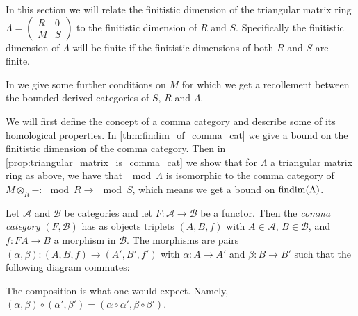 In this section we will relate the finitistic dimension of the triangular matrix ring $\Lambda = \begin{pmatrix}
R & 0\\
M& S
\end{pmatrix}$ to the finitistic dimension of $R$ and $S$. Specifically the finitistic dimension of $\Lambda$ will be finite if the finitistic dimensions of both $R$ and $S$ are finite. 

In  we give some further conditions on $M$ for which we get a recollement between the bounded derived categories of $S$, $R$ and $\Lambda$.

We will first define the concept of a comma category and describe some of its homological properties. In \cref{thm:findim_of_comma_cat} we give a bound on the finitistic dimension of the comma category. Then in \cref{prop:triangular_matrix_is_comma_cat} we show that for $\Lambda$ a triangular matrix ring as above, we have that $\mod \Lambda$ is isomorphic to the comma category of $M\otimes_R - \colon \mod R \to \mod S$, which means we get a bound on $\operatorname{findim}(\Lambda)$.

\begin{defn}
	Let $\mathcal A$ and $\mathcal B$ be categories and let $F\colon\mathcal A \to \mathcal B$ be a functor. Then the \emph{comma category} $(F, \mathcal  B)$ has as objects triplets $(A, B, f)$ with $A \in \mathcal  A$, $B \in \mathcal  B$, and $f\colon FA \to B$ a morphism in $\mathcal  B$. The morphisms are pairs $(\alpha, \beta)\colon(A, B, f) \to (A', B', f')$ with $\alpha\colon A \to A'$ and $\beta\colon B \to B'$ such that the following diagram commutes:
	\begin{center}
	\end{center}
	The composition is what one would expect. Namely, $(\alpha, \beta) \circ (\alpha', \beta') = (\alpha \circ \alpha ', \beta \circ \beta')$.
\end{defn}

